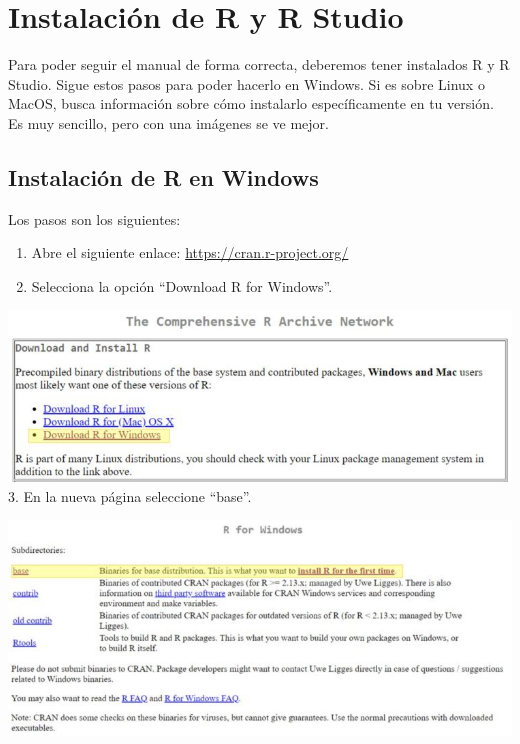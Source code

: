 \documentclass[
]{book}
\begin{document}
\hypertarget{tse01}{%
\section{Instalación de R y R Studio}\label{tse01}}

Para poder seguir el manual de forma correcta, deberemos tener instalados R y R Studio. Sigue estos pasos para poder hacerlo en Windows. Si es sobre Linux o MacOS, busca información sobre cómo instalarlo específicamente en tu versión. Es muy sencillo, pero con una imágenes se ve mejor.

\hypertarget{instalaciuxf3n-de-r-en-windows}{%
\subsection{Instalación de R en Windows}\label{instalaciuxf3n-de-r-en-windows}}

Los pasos son los siguientes:

\begin{enumerate}
\def\labelenumi{\arabic{enumi}.}
\item
  Abre el siguiente enlace: \url{https://cran.r-project.org/}
\item
  Selecciona la opción ``Download R for Windows''.
\end{enumerate}

\includegraphics{data/01.jpg}
3. En la nueva página seleccione ``base''.

\includegraphics{data/02.jpg}
\end{document}
